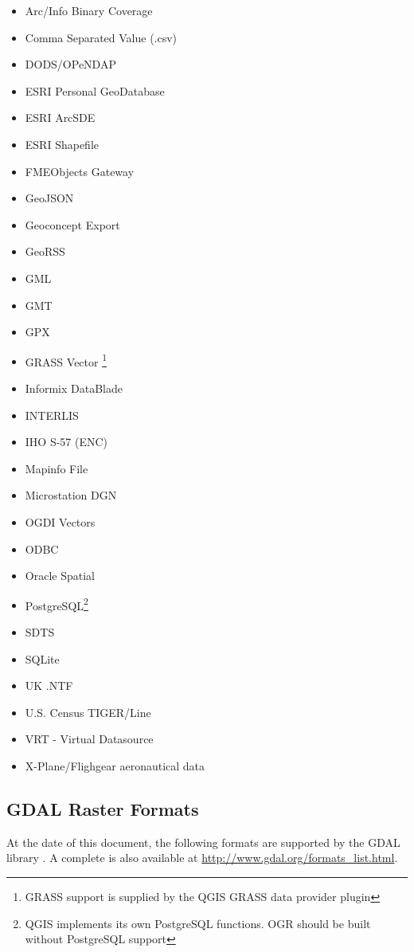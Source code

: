 \begin{itemize}
\item Arc/Info Binary Coverage
\item Comma Separated Value (.csv) 
\item DODS/OPeNDAP
\item ESRI Personal GeoDatabase
\item ESRI ArcSDE
\item ESRI Shapefile
\item FMEObjects Gateway
\item GeoJSON
\item Geoconcept Export
\item GeoRSS
\item GML
\item GMT
\item GPX
\item GRASS Vector \footnote{GRASS support is supplied by the QGIS
GRASS data provider plugin}
\item Informix DataBlade
\item INTERLIS
\item IHO S-57 (ENC)
\item Mapinfo File
\item Microstation DGN
\item OGDI Vectors
\item ODBC
\item Oracle Spatial
\item PostgreSQL\footnote{QGIS implements its own PostgreSQL functions. OGR
should be built without PostgreSQL support}
\item SDTS
\item SQLite
\item UK .NTF
\item U.S. Census TIGER/Line
\item VRT - Virtual Datasource
\item X-Plane/Flighgear aeronautical data
\end{itemize}

\subsection{GDAL Raster Formats}\label{appdx_gdal}

At the date of this document, the following formats are supported by the GDAL
library \cite{GDALweb}. A complete is also available at
\url{http://www.gdal.org/formats_list.html}.
 

